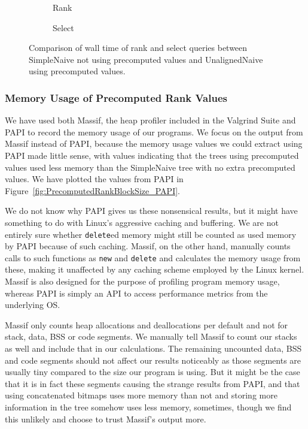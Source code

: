 \begin{figure}\tiny
	\begin{subfigure}{0.48\textwidth}
		
		\caption{Rank}
		\label{fig:PrecomputedRankBlockSize_vsNaiveInteger_Rank}
	\end{subfigure}
	\hfill
	\begin{subfigure}{0.48\textwidth}
		
		\caption{Select}
		\label{fig:PrecomputedRankBlockSize_vsNaiveInteger_Select}
	\end{subfigure}
	\caption{Comparison of wall time of rank and select queries between SimpleNaive not using precomputed values and UnalignedNaive using precomputed values.}
	\label{fig:PrecomputedRankBlockSize_vsNaiveInteger}
\end{figure}

\restoregeometry




\subsubsection{Memory Usage of Precomputed Rank Values}
We have used both Massif, the heap profiler included in the Valgrind Suite and PAPI to record the memory usage of our programs.
We focus on the output from Massif instead of PAPI, because the memory usage values we could extract using PAPI made little sense, with values indicating that the trees using precomputed values used less memory than the SimpleNaive tree with no extra precomputed values.
We have plotted the values from PAPI in Figure~\ref{fig:PrecomputedRankBlockSize_PAPI}.

We do not know why PAPI gives us these nonsensical results, but it might have something to do with Linux's aggressive caching and buffering.
We are not entirely sure whether \texttt{delete}ed memory might still be counted as used memory by PAPI because of such caching.
Massif, on the other hand, manually counts calls to such functions as \texttt{new} and \texttt{delete} and calculates the memory usage from these, making it unaffected by any caching scheme employed by the Linux kernel.
Massif is also designed for the purpose of profiling program memory usage, whereas PAPI is simply an API to access performance metrics from the underlying OS.

Massif only counts heap allocations and deallocations per default and not for stack, data, BSS or code segments.
We manually tell Massif to count our stacks as well and include that in our calculations.
The remaining uncounted data, BSS and code segments should not affect our results noticeably as those segments are usually tiny compared to the size our program is using.
But it might be the case that it is in fact these segments causing the strange results from PAPI, and that using concatenated bitmaps uses more memory than not and storing more information in the tree somehow uses less memory, sometimes, though we find this unlikely and choose to trust Massif's output more.


